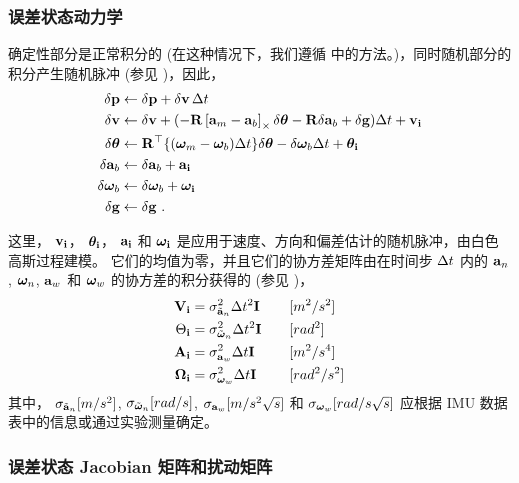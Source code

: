 \subsubsection{误差状态动力学}


确定性部分是正常积分的 (在这种情况下，我们遵循  中的方法。)，同时随机部分的积分产生随机脉冲 (参见 )，因此，
%
\begin{subequations}
%
\begin{align}
\delta{\bf p} &\gets \delta{\bf p} + \delta{\bf v}\,\Delta t \\
\delta{\bf v} &\gets \delta{\bf v} + (-{\bf R}\left[{\bf a}_{m}-{\bf a}_{b}\right]_\times\delta{\bm \theta} - {\bf R}\delta{\bf a}_{b} + \delta{\bf g})\Delta t + {\bf v}_{\bf i} \\
\delta{\bm \theta} &\gets {\bf R}^{\top}\{({\bm \omega}_{m}-{\bm \omega}_{b})\Delta t\}\delta{\bm \theta} - \delta{\bm \omega}_{b} \Delta t + {\bm \theta}_{\bf i} \\
\delta{\bf a}_{b} &\gets \delta{\bf a}_{b} + {\bf a}_{\bf i} \\
\delta{\bm \omega}_{b} &\gets \delta{\bm \omega}_{b} + {\bm \omega}_{\bf i} \\
\delta{\bf g} &\gets \delta{\bf g} ~.
\end{align}%
\end{subequations}

这里， ${\bf v}_{\bf i}$， ${\bm \theta}_{\bf i}$， ${\bf a}_{\bf i}$ 和 ${\bm \omega}_{\bf i}$ 是应用于速度、方向和偏差估计的随机脉冲，由白色高斯过程建模。 
它们的均值为零，并且它们的协方差矩阵由在时间步 $\Delta t$ 内的 ${\bf a}_n$, ${\bm \omega}_n$, ${\bf a}_w$ 和 ${\bm \omega}_w$ 的协方差的积分获得的  (参见 )，
%
%
\begin{align}
{\bf V}_{\bf i} &= \sigma_{\tilde{{\bf a}}_n}^2\Delta t^2{\bf I} \quad &&[m^2/s^2]\\
\Theta_{\bf i} &= \sigma_{\tilde{{\bm \omega}}_n}^2\Delta t^2{\bf I} \quad &&[rad^2] \\
{\bf A}_{\bf i} &= \sigma_{{\bf a}_w}^2\Delta t{\bf I} \quad &&[m^2/s^4] \\
{\bm \Omega}_{\bf i} &= \sigma_{{\bm \omega}_w}^2\Delta t{\bf I} \quad &&[rad^2/s^2] 
\end{align}%
%
其中， $\sigma_{\tilde{{\bf a}}_n}[m/s^2]$, $\sigma_{\tilde{{\bm \omega}}_n}[rad/s]$, $\sigma_{{\bf a}_w}[m/s^2\sqrt{s}]$ 和 $\sigma_{{\bm \omega}_w}[rad/s\sqrt{s}]$ 应根据 IMU 数据表中的信息或通过实验测量确定。



\subsubsection{误差状态 Jacobian 矩阵和扰动矩阵}


